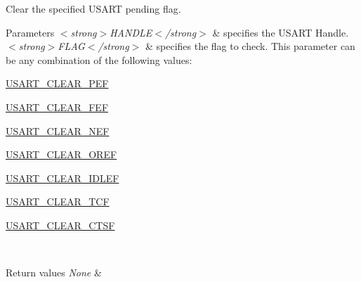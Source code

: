 Clear the specified U\+S\+A\+RT pending flag. 


\begin{DoxyParams}{Parameters}
{\em $<$strong$>$\+H\+A\+N\+D\+L\+E$<$/strong$>$} & specifies the U\+S\+A\+RT Handle. \\
\hline
{\em $<$strong$>$\+F\+L\+A\+G$<$/strong$>$} & specifies the flag to check. This parameter can be any combination of the following values\+: \begin{DoxyItemize}
\item \hyperlink{group___u_s_a_r_t___i_t___c_l_e_a_r___flags_gaf83c3d570a430dfd1a7e7a8b583736f2}{U\+S\+A\+R\+T\+\_\+\+C\+L\+E\+A\+R\+\_\+\+P\+EF} \item \hyperlink{group___u_s_a_r_t___i_t___c_l_e_a_r___flags_ga9aa038b779783f685fbc834ebf4c3077}{U\+S\+A\+R\+T\+\_\+\+C\+L\+E\+A\+R\+\_\+\+F\+EF} \item \hyperlink{group___u_s_a_r_t___i_t___c_l_e_a_r___flags_ga6c4b527c1b6ba5a01bbf6d6d3c6d6784}{U\+S\+A\+R\+T\+\_\+\+C\+L\+E\+A\+R\+\_\+\+N\+EF} \item \hyperlink{group___u_s_a_r_t___i_t___c_l_e_a_r___flags_ga3f17bca944fa3409626872985e722dbd}{U\+S\+A\+R\+T\+\_\+\+C\+L\+E\+A\+R\+\_\+\+O\+R\+EF} \item \hyperlink{group___u_s_a_r_t___i_t___c_l_e_a_r___flags_gad9927597dca4f88a05c0d5151049470a}{U\+S\+A\+R\+T\+\_\+\+C\+L\+E\+A\+R\+\_\+\+I\+D\+L\+EF} \item \hyperlink{group___u_s_a_r_t___i_t___c_l_e_a_r___flags_ga138392691d138fd7687e93fa8ec9cfda}{U\+S\+A\+R\+T\+\_\+\+C\+L\+E\+A\+R\+\_\+\+T\+CF} \item \hyperlink{group___u_s_a_r_t___i_t___c_l_e_a_r___flags_ga75f4e0fb00423650cde6e4cd8f33c9f0}{U\+S\+A\+R\+T\+\_\+\+C\+L\+E\+A\+R\+\_\+\+C\+T\+SF} \end{DoxyItemize}
\\
\hline
\end{DoxyParams}

\begin{DoxyRetVals}{Return values}
{\em None} & \\
\hline
\end{DoxyRetVals}
\mbox{\label{group___u_s_a_r_t___exported___macros_ga9805694ed8725e6b1f52c5f16cf7bbef}} 
